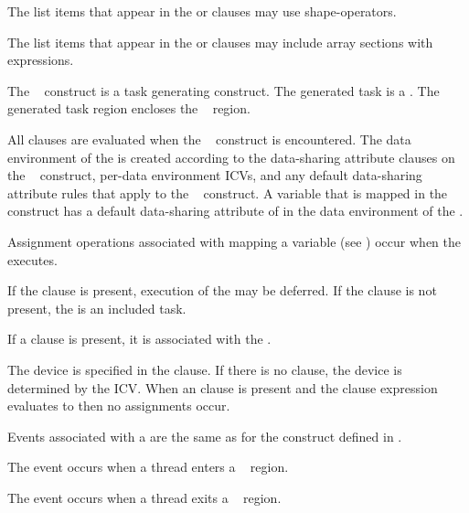 \begin{ccppspecific}
The list items that appear in the  or  clauses may
use shape-operators.
\end{ccppspecific}

The list items that appear in the  or  clauses may
include array sections with  expressions.

The ~ construct is a task generating construct.  
The generated task is a .  The generated task region encloses 
the ~ region.

All clauses are evaluated when the ~ construct is 
encountered.  The data environment of the  is created according 
to the data-sharing attribute clauses on the ~ construct, 
per-data environment ICVs, and any default data-sharing attribute rules that apply 
to the ~ construct.  A variable that is mapped in the 
~ construct has a default data-sharing attribute of 
 in the data environment of the .

Assignment operations associated with mapping a variable (see 
) occur when the  executes.

If the  clause is present, execution of the  may 
be deferred.  If the  clause is not present, the  
is an included task.

If a  clause is present, it is associated with the .

The device is specified in the  clause. If there is no  
clause, the device is determined by the  ICV. When an 
 clause is present and the  clause expression evaluates to 
 then no assignments occur.

\events

Events associated with a  are the same as for the  
construct defined in .

The  event occurs when a thread enters a
~ region.

The  event occurs when a thread exits a
~ region.

\tools

